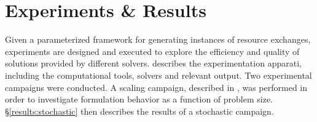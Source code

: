 \chapter{Experiments \& Results}\label{ch:results}

Given a parameterized framework for generating instances of resource exchanges,
experiments are designed and executed to explore the efficiency and quality of
solutions provided by different solvers.  describes the
experimentation apparati, including the computational tools, solvers and
relevant output. Two experimental campaigns were conducted. A scaling campaign,
described in , was performed in order to investigate
formulation behavior as a function of problem size. \S \ref {results:stochastic}
then describes the results of a stochastic campaign.






